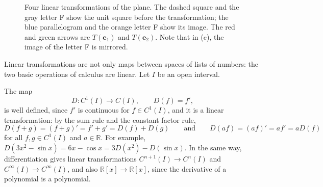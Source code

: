 \begin{figure}[ht]
    \centering
    \qquad

    \bigskip
    \qquad
    \caption[Four linear transformations of the plane]{Four linear transformations of the plane. The dashed square and the gray letter F show the unit square before the transformation; the blue parallelogram and the orange letter F show its image. The red and green arrows are $T(\mathbf{e}_1)$ and $T(\mathbf{e}_2)$. Note that in (c), the image of the letter F is mirrored.}
    \label{L1-fig:gallery}
\end{figure}

Linear transformations are not only maps between spaces of lists of numbers: the two basic operations of calculus are linear. Let $I$ be an open interval.

\begin{example}[Differentiation]\label{L1-ex:differentiation}
    The map
    \[D: C^1(I) \to C(I), \qquad D(f) = f',\]
    is well defined, since $f'$ is continuous for $f \in C^1(I)$, and it is a linear transformation: by the sum rule and the constant factor rule,
    \[D(f + g) = (f + g)' = f' + g' = D(f) + D(g) \qquad \text{and} \qquad D(af) = (af)' = af' = aD(f)\]
    for all $f, g \in C^1(I)$ and $a \in \mathbb{R}$. For example, $D(3x^2 - \sin x) = 6x - \cos x = 3D(x^2) - D(\sin x)$. In the same way, differentiation gives linear transformations $C^{n+1}(I) \to C^n(I)$ and $C^\infty(I) \to C^\infty(I)$, and also $\mathbb{R}[x] \to \mathbb{R}[x]$, since the derivative of a polynomial is a polynomial.
\end{example}


